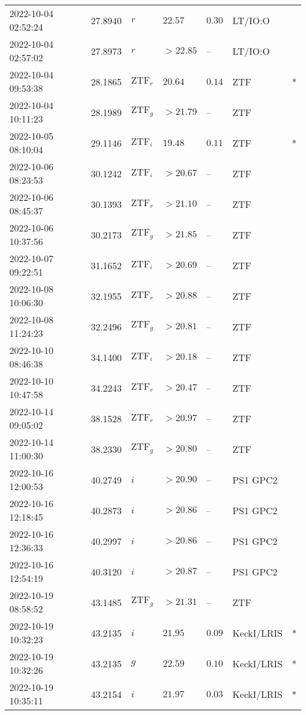 \documentclass{nature_plusfigure}
\begin{document}
\begin{supplement}
\begin{center}
\begin{longtable}{lllllll}
2022-10-04 02:52:24 & 27.8940 & $r$ & $22.57$ & $0.30$ & LT/IO:O &  \\ 
2022-10-04 02:57:02 & 27.8973 & $r$ & $>22.85$ & -- & LT/IO:O &  \\ 
2022-10-04 09:53:38 & 28.1865 & $\mathrm{ZTF}_{r}$ & $20.64$ & $0.14$ & ZTF & * \\ 
2022-10-04 10:11:23 & 28.1989 & $\mathrm{ZTF}_{g}$ & $>21.79$ & -- & ZTF &  \\ 
2022-10-05 08:10:04 & 29.1146 & $\mathrm{ZTF}_{i}$ & $19.48$ & $0.11$ & ZTF & * \\ 
2022-10-06 08:23:53 & 30.1242 & $\mathrm{ZTF}_{i}$ & $>20.67$ & -- & ZTF &  \\ 
2022-10-06 08:45:37 & 30.1393 & $\mathrm{ZTF}_{r}$ & $>21.10$ & -- & ZTF &  \\ 
2022-10-06 10:37:56 & 30.2173 & $\mathrm{ZTF}_{g}$ & $>21.85$ & -- & ZTF &  \\ 
2022-10-07 09:22:51 & 31.1652 & $\mathrm{ZTF}_{i}$ & $>20.69$ & -- & ZTF &  \\ 
2022-10-08 10:06:30 & 32.1955 & $\mathrm{ZTF}_{r}$ & $>20.88$ & -- & ZTF &  \\ 
2022-10-08 11:24:23 & 32.2496 & $\mathrm{ZTF}_{g}$ & $>20.81$ & -- & ZTF &  \\ 
2022-10-10 08:46:38 & 34.1400 & $\mathrm{ZTF}_{i}$ & $>20.18$ & -- & ZTF &  \\ 
2022-10-10 10:47:58 & 34.2243 & $\mathrm{ZTF}_{r}$ & $>20.47$ & -- & ZTF &  \\ 
2022-10-14 09:05:02 & 38.1528 & $\mathrm{ZTF}_{r}$ & $>20.97$ & -- & ZTF &  \\ 
2022-10-14 11:00:30 & 38.2330 & $\mathrm{ZTF}_{g}$ & $>20.80$ & -- & ZTF &  \\ 
2022-10-16 12:00:53 & 40.2749 & $i$ & $>20.90$ & -- & PS1 GPC2 &  \\ 
2022-10-16 12:18:45 & 40.2873 & $i$ & $>20.86$ & -- & PS1 GPC2 &  \\ 
2022-10-16 12:36:33 & 40.2997 & $i$ & $>20.86$ & -- & PS1 GPC2 &  \\ 
2022-10-16 12:54:19 & 40.3120 & $i$ & $>20.87$ & -- & PS1 GPC2 &  \\ 
2022-10-19 08:58:52 & 43.1485 & $\mathrm{ZTF}_{g}$ & $>21.31$ & -- & ZTF &  \\ 
2022-10-19 10:32:23 & 43.2135 & $i$ & $21.95$ & $0.09$ & KeckI/LRIS & * \\ 
2022-10-19 10:32:26 & 43.2135 & $g$ & $22.59$ & $0.10$ & KeckI/LRIS & * \\ 
2022-10-19 10:35:11 & 43.2154 & $i$ & $21.97$ & $0.03$ & KeckI/LRIS & * \\ 

\end{longtable}
\end{center}
\end{supplement}
\end{document}
